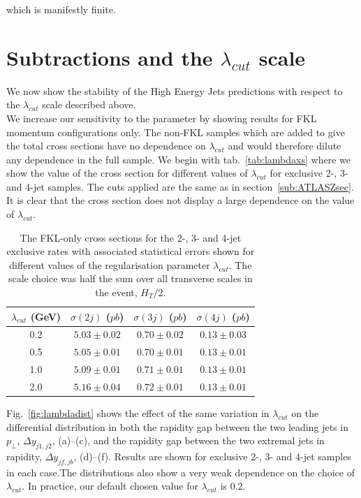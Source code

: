 		which is manifestly finite.

\section{Subtractions and the $\lambda_{cut}$ scale}
	\label{sec:indep-lambd}

	We now show the stability of the High Energy Jets predictions with respect to the
	$\lambda_{cut}$ scale described above.\\We
	increase our sensitivity to the parameter by showing results for FKL momentum
	configurations only.  The non-FKL samples which are added to give the total
	cross sections have no dependence on $\lambda_{cut}$ and would therefore dilute
	any dependence in the full sample.  We begin with tab.~\eqref{tab:lambdaxs} where we show the value of
	the cross section for different values of $\lambda_{cut}$ for exclusive 2-, 3-
	and 4-jet samples.  The cuts applied are the same as in section~\ref{sub:ATLASZsec}.
	It is clear that the cross section does not display a large dependence on the
	value of $\lambda_{cut}$.

	\begin{table}[hbt!]
		\begin{center}
		\begin{tabular}{| c | c | c | c |}
		\hline
		$\lambda_{cut}$ (GeV) & $\sigma(2j)$ ($pb$) & $\sigma(3j)$ ($pb$) & $\sigma(4j)$ ($pb$) \\ \hline
		0.2 & $5.03 \pm 0.02$ & $0.70 \pm 0.02$ & $0.13 \pm 0.03$ \\
		0.5 & $5.05 \pm 0.01$ & $0.70 \pm 0.01$ & $0.13 \pm 0.01$ \\
		1.0 & $5.09 \pm 0.01$ & $0.71 \pm 0.01$ & $0.13 \pm 0.01$ \\
		2.0 & $5.16 \pm 0.04$ & $0.72 \pm 0.01$ & $0.13 \pm 0.01$ \\ \hline
		\end{tabular}
		\caption{The FKL-only cross sections for the 2-, 3- and 4-jet exclusive rates
		with associated statistical errors shown for different values of the regularisation parameter
		$\lambda_{cut}$.  The scale choice was half the sum over all transverse scales in the event, $H_T/2$.}
		\label{tab:lambdaxs}
		\end{center}
	\end{table}

	Fig.~\eqref{fig:lambdadist} shows the effect of the same variation in $\lambda_{cut}$ on the
	differential distribution in both the rapidity gap between the two leading jets in $p_\perp$,
	$\Delta y_{j1, j2}$, (a)--(c), and the rapidity gap between the two extremal jets in
	rapidity, $\Delta y_{jf, jb}$, (d)--(f).  Results are shown for exclusive 2-, 3-
	and 4-jet samples in each case.The distributions also show a very weak
	dependence on the choice of $\lambda_{cut}$.
	In practice, our default chosen value for $\lambda_{cut}$ is 0.2.

